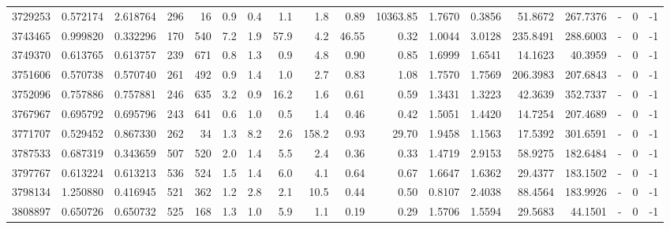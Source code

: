 \begin{tabular}{rrrrrrrrrrrrrrrlrr}
   3729253 & 0.572174 &   2.618764 &  296 &   16 &      0.9 &      0.4 &     1.1 &      1.8 &       0.89 &    10363.85 &  1.7670 &  0.3856 &   51.8672 &  267.7376 &             - &        0 &         -1 \\
   3743465 & 0.999820 &   0.332296 &  170 &  540 &      7.2 &      1.9 &    57.9 &      4.2 &      46.55 &        0.32 &  1.0044 &  3.0128 &  235.8491 &  288.6003 &             - &        0 &         -1 \\
   3749370 & 0.613765 &   0.613757 &  239 &  671 &      0.8 &      1.3 &     0.9 &      4.8 &       0.90 &        0.85 &  1.6999 &  1.6541 &   14.1623 &   40.3959 &             - &        0 &         -1 \\
   3751606 & 0.570738 &   0.570740 &  261 &  492 &      0.9 &      1.4 &     1.0 &      2.7 &       0.83 &        1.08 &  1.7570 &  1.7569 &  206.3983 &  207.6843 &             - &        0 &         -1 \\
   3752096 & 0.757886 &   0.757881 &  246 &  635 &      3.2 &      0.9 &    16.2 &      1.6 &       0.61 &        0.59 &  1.3431 &  1.3223 &   42.3639 &  352.7337 &             - &        0 &         -1 \\
   3767967 & 0.695792 &   0.695796 &  243 &  641 &      0.6 &      1.0 &     0.5 &      1.4 &       0.46 &        0.42 &  1.5051 &  1.4420 &   14.7254 &  207.4689 &             - &        0 &         -1 \\
   3771707 & 0.529452 &   0.867330 &  262 &   34 &      1.3 &      8.2 &     2.6 &    158.2 &       0.93 &       29.70 &  1.9458 &  1.1563 &   17.5392 &  301.6591 &             - &        0 &         -1 \\
   3787533 & 0.687319 &   0.343659 &  507 &  520 &      2.0 &      1.4 &     5.5 &      2.4 &       0.36 &        0.33 &  1.4719 &  2.9153 &   58.9275 &  182.6484 &             - &        0 &         -1 \\
   3797767 & 0.613224 &   0.613213 &  536 &  524 &      1.5 &      1.4 &     6.0 &      4.1 &       0.64 &        0.67 &  1.6647 &  1.6362 &   29.4377 &  183.1502 &             - &        0 &         -1 \\
   3798134 & 1.250880 &   0.416945 &  521 &  362 &      1.2 &      2.8 &     2.1 &     10.5 &       0.44 &        0.50 &  0.8107 &  2.4038 &   88.4564 &  183.9926 &             - &        0 &         -1 \\
   3808897 & 0.650726 &   0.650732 &  525 &  168 &      1.3 &      1.0 &     5.9 &      1.1 &       0.19 &        0.29 &  1.5706 &  1.5594 &   29.5683 &   44.1501 &             - &        0 &         -1 \\

\end{tabular}

